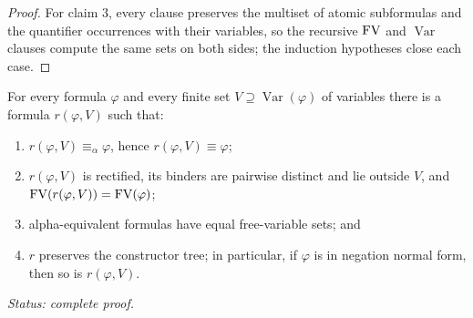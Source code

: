 \begin{proof}
For claim 3, every clause preserves the multiset of atomic subformulas
and the quantifier occurrences with their variables, so the recursive
\(\operatorname{FV}\) and \(\operatorname{Var}\) clauses compute the same sets on both
sides; the induction hypotheses close each case.
\end{proof}

\begin{lemma}
\label{lem:rectified-variant}
For every formula \(\varphi\) and every finite set
\(V\supseteq\operatorname{Var}(\varphi)\) of variables there is a formula
\(r(\varphi,V)\) such that:
\begin{enumerate}
  \item \(r(\varphi,V)\equiv_\alpha\varphi\), hence
        \(r(\varphi,V)\equiv\varphi\);
  \item \(r(\varphi,V)\) is rectified, its binders are pairwise distinct
        and lie outside \(V\), and
        \(\operatorname{FV}(r(\varphi,V))=\operatorname{FV}(\varphi)\);
  \item alpha-equivalent formulas have equal free-variable sets; and
  \item \(r\) preserves the constructor tree; in particular, if
        \(\varphi\) is in negation normal form, then so is
        \(r(\varphi,V)\).
\end{enumerate}
\textit{Status: complete proof.}
\end{lemma}
